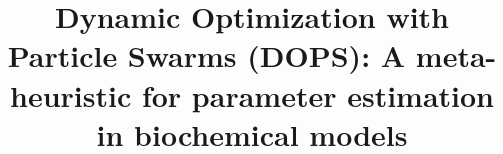 \documentclass{bmcart}
\begin{document}
\begin{frontmatter}

\begin{fmbox}


\title{Dynamic Optimization with Particle Swarms (DOPS): A meta-heuristic for parameter estimation in biochemical models}


\author[
   addressref={aff1},                   %
   noteref={n1},                        %
   email={asg242@cornell.edu}   %
]{ }
\author[
   addressref={aff1},
   email={ril34@cornell.edu},
   noteref={n1}
]{ }
\author[
   addressref={aff2},
   email={jdv27@cornell.edu}
]{ }
\author[
   addressref={aff1},
   corref={aff1},
   email={jdv27@cornell.edu}
]{ }


\address[id=aff1]{%
  , %
  ,                     %
  ,                              %
}
\address[id=aff2]{%
  ,
  ,
  ,
}


\end{fmbox}
\end{frontmatter}
\end{document}
